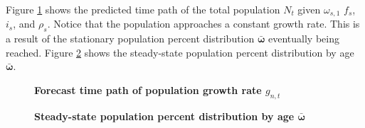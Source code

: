 \documentclass[letterpaper,12pt]{article}
\theoremstyle{definition}
\begin{document}
  Figure \ref{FigPopPath} shows the predicted time path of the total population $N_t$ given $\omega_{s,1}$ $f_s$, $i_s$, and $\rho_s$. Notice that the population approaches a constant growth rate. This is a result of the stationary population percent distribution $\bm{\bar{\omega}}$ eventually being reached. Figure \ref{FigSSpopdist} shows the steady-state population percent distribution by age $\bm{\bar{\omega}}$.

  \begin{figure}[htbp]\centering \captionsetup{width=4.0in}
    \caption{\label{FigPopPath}\textbf{Forecast time path of population growth rate $g_{n,t}$}}
  \end{figure}

  \begin{figure}[htbp]\centering \captionsetup{width=4.0in}
    \caption{\label{FigSSpopdist}\textbf{Steady-state population percent distribution by age $\bm{\bar{\omega}}$}}
  \end{figure}
  \clearpage
\end{document}
